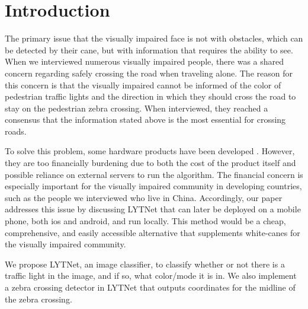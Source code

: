 \documentclass[runningheads]{llncs}
\begin{document}
\section{Introduction}
The primary issue that the visually impaired face is not with obstacles, which can be detected by their cane, but with information that requires the ability to see. When we interviewed numerous visually impaired people, there was a shared concern regarding safely crossing the road when traveling alone. The reason for this concern is that the visually impaired cannot be informed of the color of pedestrian traffic lights and the direction in which they should cross the road to stay on the pedestrian zebra crossing. When interviewed, they reached a consensus that the information stated above is the most essential for crossing roads.

To solve this problem, some hardware products have been developed \cite{1}. However, they are too financially burdening due to both the cost of the product itself and possible reliance on external servers to run the algorithm. The financial concern is especially important for the visually impaired community in developing countries, such as the people we interviewed who live in China. Accordingly, our paper addresses this issue by discussing LYTNet that can later be deployed on a mobile phone, both ios and android, and run locally. This method would be a cheap, comprehensive, and easily accessible alternative that supplements white-canes for the visually impaired community. 

We propose LYTNet, an image classifier, to classify whether or not there is a traffic light in the image, and if so, what color/mode it is in. We also implement a zebra crossing detector in LYTNet that outputs coordinates for the midline of the zebra crossing.
\end{document}
